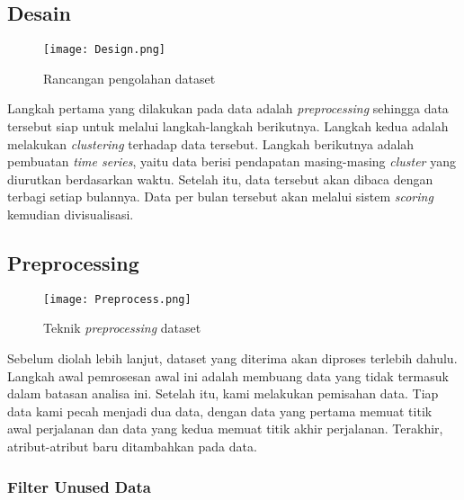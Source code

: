 \documentclass{article}
\begin{document}
\subsection{Desain}

\begin{adjustwidth}{2em}{0pt}

\begin{figure}[H]
	\centering
	\texttt{[image: Design.png]}
	\caption{Rancangan pengolahan dataset}
\end{figure}

\hspace{\parindent}Langkah pertama yang dilakukan pada data adalah \textit{preprocessing} sehingga data tersebut siap untuk melalui langkah-langkah berikutnya. Langkah kedua adalah melakukan \textit{clustering} terhadap data tersebut. Langkah berikutnya adalah pembuatan \textit{time series}, yaitu data berisi pendapatan masing-masing \textit{cluster} yang diurutkan berdasarkan waktu. Setelah itu, data tersebut akan dibaca dengan terbagi setiap bulannya. Data per bulan tersebut akan melalui sistem \textit{scoring} kemudian divisualisasi.

\end{adjustwidth}

\subsection{Preprocessing}

\begin{adjustwidth}{2em}{0pt}

\begin{figure}[H]
	\centering
	\texttt{[image: Preprocess.png]}
	\caption{Teknik \textit{preprocessing} dataset}
\end{figure}

\hspace{\parindent}Sebelum diolah lebih lanjut, dataset yang diterima akan diproses terlebih dahulu. Langkah awal pemrosesan awal ini adalah membuang data yang tidak termasuk dalam batasan analisa ini. Setelah itu, kami melakukan pemisahan data. Tiap data kami pecah menjadi dua data, dengan data yang pertama memuat titik awal perjalanan dan data yang kedua memuat titik akhir perjalanan. Terakhir, atribut-atribut baru ditambahkan pada data.

\end{adjustwidth}

\subsubsection{Filter Unused Data}
\end{document}
